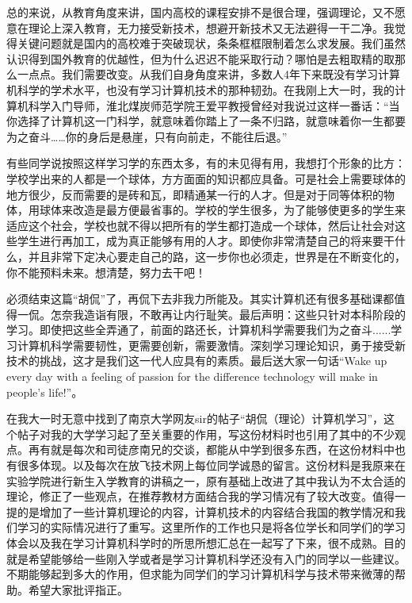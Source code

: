 总的来说，从教育角度来讲，国内高校的课程安排不是很合理，强调理论，又不愿意在理论上深入教育，无力接受新技术，想避开新技术又无法避得一干二净。我觉得关键问题就是国内的高校难于突破现状，条条框框限制着怎么求发展。我们虽然认识得到国外教育的优越性，但为什么迟迟不能采取行动？哪怕是去粗取精的取那么一点点。我们需要改变。从我们自身角度来讲，多数人4年下来既没有学习计算机科学的学术水平，也没有学习计算机技术的那种韧劲。在我刚上大一时，我的计算机科学入门导师，淮北煤炭师范学院王爱平教授曾经对我说过这样一番话：“当你选择了计算机这一门科学，就意味着你踏上了一条不归路，就意味着你一生都要为之奋斗……你的身后是悬崖，只有向前走，不能往后退。”


有些同学说按照这样学习学的东西太多，有的未见得有用，我想打个形象的比方：学校学出来的人都是一个球体，方方面面的知识都应具备。可是社会上需要球体的地方很少，反而需要的是砖和瓦，即精通某一行的人才。但是对于同等体积的物体，用球体来改造是最方便最省事的。学校的学生很多，为了能够使更多的学生来适应这个社会，学校也就不得以把所有的学生都打造成一个球体，然后让社会对这些学生进行再加工，成为真正能够有用的人才。即使你非常清楚自己的将来要干什么，并且非常下定决心要走自己的路，这一步你也必须走，世界是在不断变化的，你不能预料未来。想清楚，努力去干吧！


必须结束这篇“胡侃”了，再侃下去非我力所能及。其实计算机还有很多基础课都值得一侃。怎奈我造诣有限，不敢再让内行耻笑。最后声明：这些只针对本科阶段的学习。即使把这些全弄通了，前面的路还长，计算机科学需要我们为之奋斗......学习计算机科学需要韧性，更需要创新，需要激情。深刻学习理论知识，勇于接受新技术的挑战，这才是我们这一代人应具有的素质。最后送大家一句话“Wake up every day with a feeling of passion for the difference technology will make in people's life!”。

在我大一时无意中找到了南京大学网友sir的帖子“胡侃（理论）计算机学习”，这个帖子对我的大学学习起了至关重要的作用，写这份材料时也引用了其中的不少观点。再有就是每次和司徒彦南兄的交谈，都能从中学到很多东西，在这份材料中也有很多体现。以及每次在放飞技术网上每位同学诚恳的留言。这份材料是我原来在实验学院进行新生入学教育的讲稿之一，原有基础上改进了其中我认为不太合适的理论，修正了一些观点，在推荐教材方面结合我的学习情况有了较大改变。值得一提的是增加了一些计算机理论的内容，计算机技术的内容结合我国的教学情况和我们学习的实际情况进行了重写。这里所作的工作也只是将各位学长和同学们的学习体会以及我在学习计算机科学时的所思所想汇总在一起写了下来，很不成熟。目的就是希望能够给一些刚入学或者是学习计算机科学还没有入门的同学以一些建议。不期能够起到多大的作用，但求能为同学们的学习计算机科学与技术带来微薄的帮助。希望大家批评指正。

